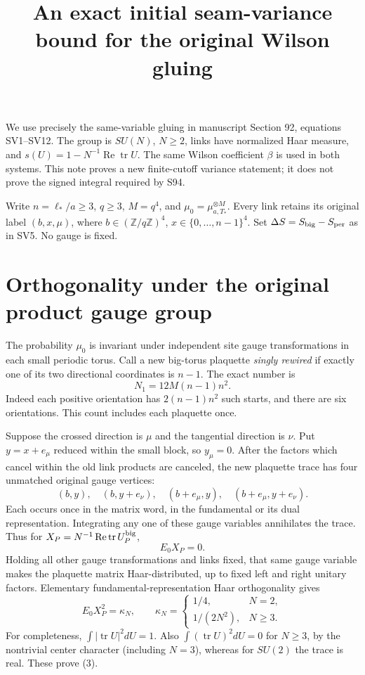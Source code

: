 \documentclass{article}
\title{An exact initial seam-variance bound for the original Wilson gluing}\author{}\date{}
\begin{document}
\maketitle
We use precisely the same-variable gluing in manuscript Section 92, equations SV1--SV12. The group is $SU(N)$, $N\geq2$, links have normalized Haar measure, and $s(U)=1-N^{-1}\operatorname{Re}\operatorname{tr}U$. The same Wilson coefficient $\beta$ is used in both systems. This note proves a new finite-cutoff variance statement; it does not prove the signed integral required by S94.

Write $n=\ell_*/a\geq3$, $q\geq3$, $M=q^4$, and $\mu_0=\mu_{a,T_*}^{\otimes M}$. Every link retains its original label $(b,x,\mu)$, where $b\in(\mathbb Z/q\mathbb Z)^4$, $x\in\{0,\ldots,n-1\}^4$. Set $\Delta S=S_{\rm big}-S_{\rm per}$ as in SV5. No gauge is fixed.

\section{Orthogonality under the original product gauge group}
The probability $\mu_0$ is invariant under independent site gauge transformations in each small periodic torus. Call a new big-torus plaquette \emph{singly rewired} if exactly one of its two directional coordinates is $n-1$. The exact number is
\[
 N_1=12M(n-1)n^2.
 \tag{1}
\]
Indeed each positive orientation has $2(n-1)n^2$ such starts, and there are six orientations. This count includes each plaquette once.

Suppose the crossed direction is $\mu$ and the tangential direction is $\nu$. Put $y=x+e_\mu$ reduced within the small block, so $y_\mu=0$. After the factors which cancel within the old link products are canceled, the new plaquette trace has four unmatched original gauge vertices:
\[
 (b,y),\quad(b,y+e_\nu),\quad
 (b+e_\mu,y),\quad(b+e_\mu,y+e_\nu).
 \tag{2}
\]
Each occurs once in the matrix word, in the fundamental or its dual representation. Integrating any one of these gauge variables annihilates the trace. Thus for
$X_P=N^{-1}\operatorname{Re}\operatorname{tr}U_P^{\rm big}$,
\[
 E_0X_P=0.
\]
Holding all other gauge transformations and links fixed, that same gauge variable makes the plaquette matrix Haar-distributed, up to fixed left and right unitary factors. Elementary fundamental-representation Haar orthogonality gives
\[
 E_0X_P^2=\kappa_N,\qquad
 \kappa_N=\begin{cases}1/4,&N=2,\\1/(2N^2),&N\geq3.\end{cases}
 \tag{3}
\]
For completeness, $\int|\operatorname{tr}U|^2dU=1$. Also $\int(\operatorname{tr}U)^2dU=0$ for $N\geq3$, by the nontrivial center character (including $N=3$), whereas for $SU(2)$ the trace is real. These prove (3).
\end{document}
